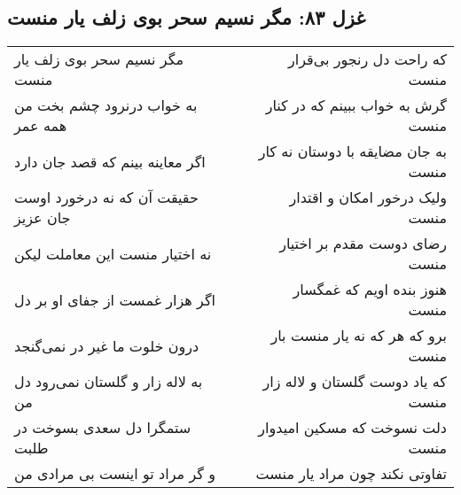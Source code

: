 \begin{center}
\section*{غزل ۸۳: مگر نسیم سحر بوی زلف یار منست}
\label{sec:083}
\begin{longtable}{l p{0.5cm} r}
مگر نسیم سحر بوی زلف یار منست
&&
که راحت دل رنجور بی‌قرار منست
\\
به خواب درنرود چشم بخت من همه عمر
&&
گرش به خواب ببینم که در کنار منست
\\
اگر معاینه بینم که قصد جان دارد
&&
به جان مضایقه با دوستان نه کار منست
\\
حقیقت آن که نه درخورد اوست جان عزیز
&&
ولیک درخور امکان و اقتدار منست
\\
نه اختیار منست این معاملت لیکن
&&
رضای دوست مقدم بر اختیار منست
\\
اگر هزار غمست از جفای او بر دل
&&
هنوز بنده اویم که غمگسار منست
\\
درون خلوت ما غیر در نمی‌گنجد
&&
برو که هر که نه یار منست بار منست
\\
به لاله زار و گلستان نمی‌رود دل من
&&
که یاد دوست گلستان و لاله زار منست
\\
ستمگرا دل سعدی بسوخت در طلبت
&&
دلت نسوخت که مسکین امیدوار منست
\\
و گر مراد تو اینست بی مرادی من
&&
تفاوتی نکند چون مراد یار منست
\\
\end{longtable}
\end{center}
